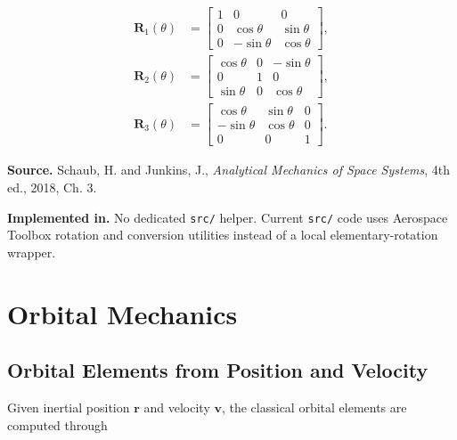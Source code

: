 \documentclass[11pt]{article}
\newcommand{\vect}[1]{\boldsymbol{#1}}
\begin{document}
\begin{align}
\mathbf{R}_1(\theta) &=
\begin{bmatrix}
1 & 0 & 0 \\
0 & \cos\theta & \sin\theta \\
0 & -\sin\theta & \cos\theta
\end{bmatrix}, \\
\mathbf{R}_2(\theta) &=
\begin{bmatrix}
\cos\theta & 0 & -\sin\theta \\
0 & 1 & 0 \\
\sin\theta & 0 & \cos\theta
\end{bmatrix}, \\
\mathbf{R}_3(\theta) &=
\begin{bmatrix}
\cos\theta & \sin\theta & 0 \\
-\sin\theta & \cos\theta & 0 \\
0 & 0 & 1
\end{bmatrix}.
\end{align}

\textbf{Source.} Schaub, H. and Junkins, J., \emph{Analytical Mechanics
of Space Systems}, 4th ed., 2018, Ch. 3.

\textbf{Implemented in.} No dedicated \texttt{src/} helper. Current
\texttt{src/} code uses Aerospace Toolbox rotation and conversion
utilities instead of a local elementary-rotation wrapper.

\section{Orbital Mechanics}

\subsection{Orbital Elements from Position and Velocity}

Given inertial position $\vect{r}$ and velocity $\vect{v}$, the classical
orbital elements are computed through
\end{document}
